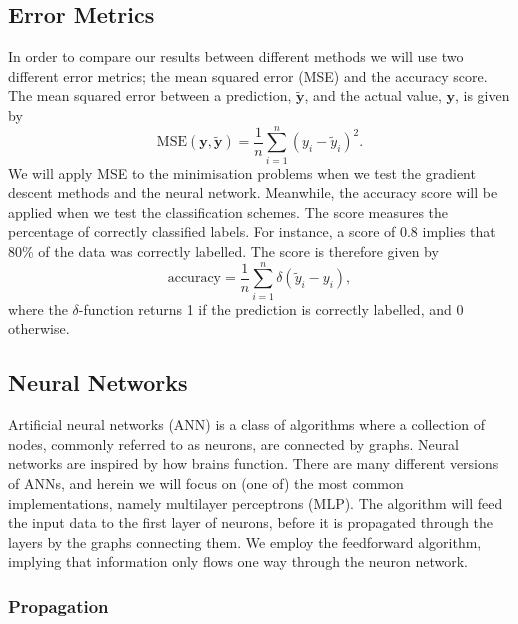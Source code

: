\documentclass[a4paper,
amsfonts,
amssymb,
amsmath,
reprint,
showkeys,
nofootinbib,
twoside]{revtex4-2}
\begin{document}
\subsection{Error Metrics}

In order to compare our results between different methods we will use two different error metrics; the mean squared error (MSE) and the accuracy score.
The mean squared error between a prediction, $\mathbf{\tilde{y}}$, and the actual value, $\mathbf{y}$, is given by
\begin{equation}
    \textrm{MSE}(\bm{y}, \bm{\tilde{y}}) = \frac{1}{n}\sum_{i = 1}^n (y_i - \tilde{y}_i)^2.
\end{equation}
We will apply MSE to the minimisation problems when we test the gradient descent methods and the neural network.
Meanwhile, the accuracy score will be applied when we test the classification schemes. The score measures the percentage of correctly classified labels. For instance, a score of $0.8$ implies that 80\% of the data was correctly labelled. The score is therefore given by
\begin{equation}
    \textrm{accuracy} = \frac{1}{n}\sum_{i = 1}^n \delta(\tilde{y}_i - y_i),
\end{equation}
where the $\delta$-function returns 1 if the prediction is correctly labelled, and 0 otherwise.




\subsection{Neural Networks}

Artificial neural networks (ANN) is a class of algorithms where a collection of nodes, commonly referred to as neurons, are connected by graphs. Neural networks are inspired by how brains function. There are many different versions of ANNs, and herein we will focus on (one of) the most common implementations, namely multilayer perceptrons (MLP). The algorithm will feed the input data to the first layer of neurons, before it is propagated through the layers by the graphs connecting them. We employ the feedforward algorithm, implying that information only flows one way through the neuron network.

\subsubsection{Propagation}
\end{document}
